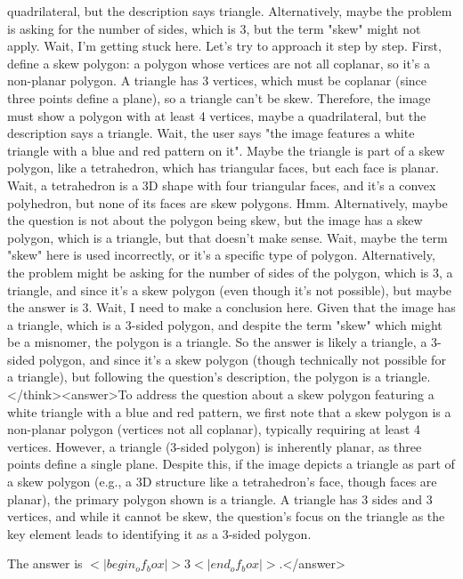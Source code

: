 quadrilateral, but the description says triangle. Alternatively, maybe the problem is asking for the number of sides, which is 3, but the term "skew" might not apply. Wait, I'm getting stuck here. Let's try to approach it step by step. First, define a skew polygon: a polygon whose vertices are not all coplanar, so it's a non-planar polygon. A triangle has 3 vertices, which must be coplanar (since three points define a plane), so a triangle can't be skew. Therefore, the image must show a polygon with at least 4 vertices, maybe a quadrilateral, but the description says a triangle. Wait, the user says "the image features a white triangle with a blue and red pattern on it". Maybe the triangle is part of a skew polygon, like a tetrahedron, which has triangular faces, but each face is planar. Wait, a tetrahedron is a 3D shape with four triangular faces, and it's a convex polyhedron, but none of its faces are skew polygons. Hmm. Alternatively, maybe the question is not about the polygon being skew, but the image has a skew polygon, which is a triangle, but that doesn't make sense. Wait, maybe the term "skew" here is used incorrectly, or it's a specific type of polygon. Alternatively, the problem might be asking for the number of sides of the polygon, which is 3, a triangle, and since it's a skew polygon (even though it's not possible), but maybe the answer is 3. Wait, I need to make a conclusion here. Given that the image has a triangle, which is a 3-sided polygon, and despite the term "skew" which might be a misnomer, the polygon is a triangle. So the answer is likely a triangle, a 3-sided polygon, and since it's a skew polygon (though technically not possible for a triangle), but following the question's description, the polygon is a triangle.</think><answer>To address the question about a skew polygon featuring a white triangle with a blue and red pattern, we first note that a skew polygon is a non-planar polygon (vertices not all coplanar), typically requiring at least 4 vertices. However, a triangle (3-sided polygon) is inherently planar, as three points define a single plane. Despite this, if the image depicts a triangle as part of a skew polygon (e.g., a 3D structure like a tetrahedron’s face, though faces are planar), the primary polygon shown is a triangle. A triangle has 3 sides and 3 vertices, and while it cannot be skew, the question’s focus on the triangle as the key element leads to identifying it as a 3-sided polygon.  

The answer is \(<|begin_of_box|>3<|end_of_box|>\).</answer>